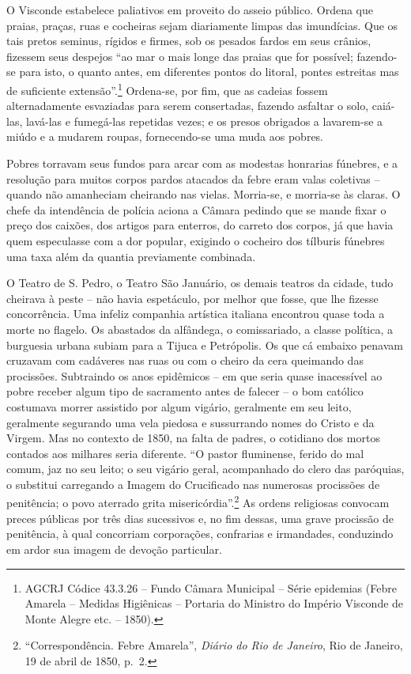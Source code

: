 O Visconde estabelece paliativos em proveito do asseio público. Ordena
que praias, praças, ruas e cocheiras sejam diariamente limpas das
imundícias. Que os tais pretos seminus, rígidos e firmes, sob os pesados
fardos em seus crânios, fizessem seus despejos ``ao mar o mais longe das
praias que for possível; fazendo-se para isto, o quanto antes, em
diferentes pontos do litoral, pontes estreitas mas de suficiente
extensão''.\footnote{AGCRJ Códice 43.3.26 -- Fundo Câmara Municipal --
  Série epidemias (Febre Amarela -- Medidas Higiênicas -- Portaria do
  Ministro do Império Visconde de Monte Alegre etc. -- 1850).}
Ordena-se, por fim, que as cadeias fossem alternadamente esvaziadas para
serem consertadas, fazendo asfaltar o solo, caiá-las, lavá-las e
fumegá-las repetidas vezes; e os presos obrigados a lavarem-se a miúdo e
a mudarem roupas, fornecendo-se uma muda aos pobres.

Pobres torravam seus fundos para arcar com as modestas honrarias
fúnebres, e a resolução para muitos corpos pardos atacados da febre eram
valas coletivas -- quando não amanheciam cheirando nas vielas.
Morria-se, e morria-se às claras. O chefe da intendência de polícia
aciona a Câmara pedindo que se mande fixar o preço dos caixões, dos
artigos para enterros, do carreto dos corpos, já que havia quem
especulasse com a dor popular, exigindo o cocheiro dos tílburis fúnebres
uma taxa além da quantia previamente combinada.

O Teatro de S. Pedro, o Teatro São Januário, os demais teatros da
cidade, tudo cheirava à peste -- não havia espetáculo, por melhor que
fosse, que lhe fizesse concorrência. Uma infeliz companhia artística
italiana encontrou quase toda a morte no flagelo. Os abastados da
alfândega, o comissariado, a classe política, a burguesia urbana subiam
para a Tijuca e Petrópolis. Os que cá embaixo penavam cruzavam com
cadáveres nas ruas ou com o cheiro da cera queimando das procissões.
Subtraindo os anos epidêmicos -- em que seria quase inacessível ao pobre
receber algum tipo de sacramento antes de falecer -- o bom católico
costumava morrer assistido por algum vigário, geralmente em seu leito,
geralmente segurando uma vela piedosa e sussurrando nomes do Cristo e da
Virgem. Mas no contexto de 1850, na falta de padres, o cotidiano dos
mortos contados aos milhares seria diferente. ``O pastor fluminense,
ferido do mal comum, jaz no seu leito; o seu vigário geral, acompanhado
do clero das paróquias, o substitui carregando a Imagem do Crucificado
nas numerosas procissões de penitência; o povo aterrado grita
misericórdia''.\footnote{``Correspondência. Febre Amarela'',
  \emph{Diário do Rio de Janeiro}, Rio de Janeiro, 19 de abril de 1850,
  p.~2.} As ordens religiosas convocam preces públicas por três dias
sucessivos e, no fim dessas, uma grave procissão de penitência, à qual
concorriam corporações, confrarias e irmandades, conduzindo em ardor sua
imagem de devoção particular.

